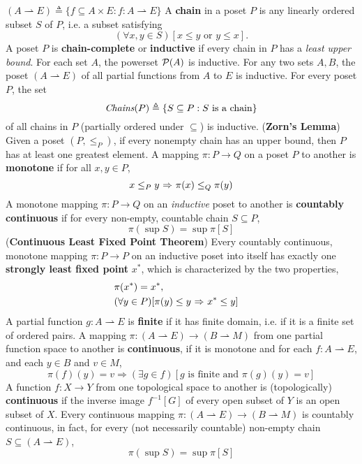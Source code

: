 \documentclass{myproc}
\begin{document}
		\bit
		\w $(A \rightharpoonup E) \triangleq \{f \subseteq A \times E:
			f: A \rightharpoonup E\}$
		\eit
\w A {\bf{}chain} in a poset $P$ is any linearly ordered subset $S$
	of $P$, i.e. a subset satisfying
		\[ (\forall{x, y \in S})[x \le y \mbox{\ or\ } y \le x]. \]
	A poset $P$ is {\bf{}chain-complete} or {\bf{}inductive} if
	every chain in $P$ has a {\em{}least upper bound\/}.
	\bit
	\w For each set $A$, the powerset ${\cal{}P}(A)$ is inductive.
	\w For any two sets $A, B$, the poset $(A \rightharpoonup E)$
		of all partial functions from $A$ to $E$ is inductive.
	\w For every poset $P$, the set
		\[ \mbox{\em{}Chains}(P) 
		\triangleq \{S \subseteq P: S \mbox{\ is a chain}\} \]
		of all chains in $P$ (partially ordered under $\subseteq$) is
		inductive.
	\eit
\w ({\bf{}Zorn's Lemma}) Given a poset $(P, \le_P)$, if every nonempty
	chain has an upper bound, then $P$ has at least one
	greatest element.
\w A mapping $\pi: P \rightarrow Q$ on a poset $P$ to another is
	{\bf{}monotone} if for all $x, y \in P$,
		\[ x \le_P y\ \mbox{$\Rightarrow$}\ \pi(x) \le_Q \pi(y) \]
\w A monotone mapping $\pi: P \rightarrow Q$ on an {\em{}inductive\/} poset
	to another is {\bf{}countably continuous} if for every
	non-empty, countable chain $S \subseteq P$,
		\[\pi(\sup S) = \sup \pi[S]\]
\w ({\bf{}Continuous Least Fixed Point Theorem})
	Every countably continuous, monotone mapping $\pi: P \rightarrow P$ 
	on an
	inductive poset into itself has exactly one
	{\bf{}strongly least fixed point} $x^*$, which is characterized by
	the two properties,
	\begin{eqnarray*}
		& \pi(x^*) = x^*, &\\
		&(\forall{y \in P})[\pi(y) \le y\ \mbox{$\Rightarrow$}\ x^* \le y]&
	\end{eqnarray*}
\w A partial function $g: A \rightharpoonup E$ is {\bf{}finite}
	if it has finite domain, i.e. if it is a finite set of ordered pairs.
	A mapping $\pi: (A \rightharpoonup E) \rightarrow (B \rightharpoonup M)$ 
	from one partial function space to another
	is {\bf{}continuous}, if it is monotone and for each 
	$f: A \rightharpoonup E$, and each $y \in B$ and $v \in M$,
	\[ \pi(f)(y) = v \Rightarrow (\exists{g}\in f)[g \mbox{\ is finite\ and\ }
	\pi(g)(y) = v]\]
	\bit
	\w A function $f: X \rightarrow Y$ from one topological space to another
		is (topologically) {\bf{}continuous} if the inverse  image 
		$f^{-1}[G]$ of every open subset of $Y$ is an open subset of $X$.
	\eit
\w Every continuous mapping $\pi: (A \rightharpoonup E) \rightarrow
	(B \rightharpoonup M)$ is countably continuous, in fact, for every
	(not necessarily countable) non-empty chain $S \subseteq (A 
	\rightharpoonup E)$, 
		\[ \pi(\sup S) = \sup \pi[S] \]
\eit
\end{document}
